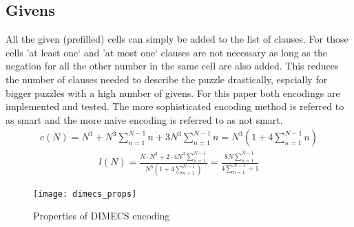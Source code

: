 \subsection{Givens}
All the given (prefilled) cells can simply be added to the list of clauses. For those cells 'at least one` and 'at most one` clauses are not necessary as long as the negation for all the other number in the same cell are also added. This reduces the number of clauses needed to describe the puzzle drastically, espcially for bigger puzzles with a high number of givens. For this paper both encodings are implemented and tested. The more sophisticated encoding method is referred to as smart and the more naive encoding is referred to as not smart.
\begin{align}
  \label{eq_clauses}
  c(N) = N^3 + N^3 \sum_{n=1}^{N-1}n + 3N^3\sum_{n=1}^{N-1}n = N^3(1 + 4\sum_{n=1}^{N-1}n)
\end{align}
\begin{align}
  \label{eq_clauses_avg_length}
  l(N) = \frac{N\cdot N^3 + 2\cdot4 N^3 \sum_{n=1}^{N-1}}{N^3(1 + 4\sum_{n=1}^{N-1})} = \frac{8N\sum_{n=1}^{N-1}}{4\sum_{n=1}^{N-1}+1}
\end{align}

\begin{figure}
  \centering
  \label{fig_dimecs_props}
  \texttt{[image: dimecs\_props]}
  
  \caption{Properties of DIMECS encoding}
\end{figure}

